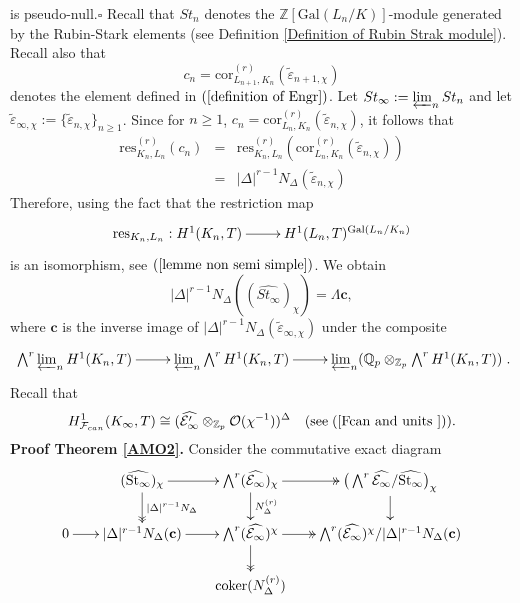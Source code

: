 \documentclass[reqno]{amsart}
\begin{document}
is pseudo-null.\hfill $\square$\vskip 6pt
  Recall that $St_{n}$ denotes the
  $\mathbb{Z}[\mathrm{Gal}(L_{n}/K)]$-module generated  by the
  Rubin-Stark elements (see Definition \ref{Definition of Rubin Strak
  module}). Recall also that
$$
c_{n}=\mathrm{cor}^{(r)}_{L_{n+1},K_{n}}(\widetilde{\varepsilon}_{n+1,\chi})
$$
denotes the element defined in $(\ref{definition of Engr})$. Let
$St_{\infty}:=\varprojlim_{n}St_{n}$ and let
$\widetilde{\varepsilon}_{\infty,\chi}:=\{\widetilde{\varepsilon}_{n,\chi}\}_{n\geq
1}$. Since for $n\geq 1$, $
c_{n}=\mathrm{cor}^{(r)}_{L_{n},K_{n}}(\widetilde{\varepsilon}_{n,\chi})
$, it follows that
\begin{eqnarray*}
  \mathrm{res}^{(r)}_{K_{n},L_{n}}(c_{n}) &=& \mathrm{res}^{(r)}_{K_{n},L_{n}}(\mathrm{cor}^{(r)}_{L_{n},K_{n}}(\widetilde{\varepsilon}_{n,\chi})) \\
   &=& |\Delta|^{r-1}N_{\Delta}(\widetilde{\varepsilon}_{n,\chi})
\end{eqnarray*}
 Therefore, using the fact that the restriction map
$$
\xymatrix@=2pc{\mathrm{res}_{K_{n},L_{n}} : H^{1}(K_{n},T)\ar[r]&
H^{1}(L_{n},T)^{\mathrm{Gal}(L_{n}/K_{n})}}
$$ is an isomorphism, see  $(\ref{lemme non semi simple})$. We obtain
$$
|\Delta|^{r-1}N_{\Delta}((\widehat{St_{\infty}})_{\chi})= \Lambda
\mathbf{c},
$$
where $\mathbf{c}$ is the inverse image of
$|\Delta|^{r-1}N_{\Delta}(\widetilde{\varepsilon}_{\infty,\chi})$
under the composite
$$
\xymatrix@=2pc{\bigwedge^{r}\varprojlim_{n}H^{1}(K_{n},T)\ar[r]&
\varprojlim_{n}\bigwedge^{r}H^{1}(K_{n},T)\ar[r]&
\varprojlim_{n}(\mathbb{Q}_{p}\otimes_{\mathbb{Z}_{p}}\bigwedge^{r}H^{1}(K_{n},T))}.
$$
Recall that
$$
H^{1}_{\mathcal{F}_{can}}(K_{\infty},T)\cong
(\widehat{\mathcal{E}^{\prime}_{\infty}}\otimes_{\mathbb{Z}_{p}}\mathcal{O}(\chi^{-1}))^{\Delta}
\quad(\mbox{see}\; (\ref{Fcan and units })).
$$
 \noindent \textbf{Proof Theorem \ref{AMO2}.}
 Consider the commutative exact diagram
$$
\xymatrix@=1.5pc{ &
(\widehat{\mathrm{St}_{\infty}})_{\chi}\ar[r]\ar@{->>}[d]^-{|\Delta|^{r-1}N_{\Delta}}&
\bigwedge^{r}(\widehat{\mathcal{E}_{\infty}})_{\chi}\ar@{->>}[r]\ar[d]^-{N^{(r)}_{\Delta}}&
\big(\bigwedge^{r}\widehat{\mathcal{E}_{\infty}}/\widehat{\mathrm{St}_{\infty}}\big)_{\chi}\ar[d]\\
0\ar[r]&|\Delta|^{r-1}N_{\Delta}(\mathbf{c})\ar[r]&
\bigwedge^{r}(\widehat{\mathcal{E}_{\infty}})^{\chi}\ar@{->>}[r]\ar@{->>}[d]&
\bigwedge^{r}(\widehat{\mathcal{E}_{\infty}})^{\chi}/|\Delta|^{r-1}N_{\Delta}(\mathbf{c})\\
  &  & \mathrm{coker}(N^{(r)}_{\Delta})& }
$$
\end{document}
